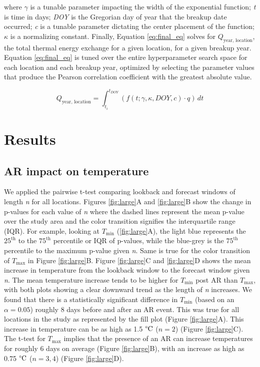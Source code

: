 \documentclass[12pts,draft]{AR_analysis_}
\begin{document}
\noindent where $\gamma$ is a tunable parameter impacting the width of
the exponential function; \emph{t} is time in days; 
\emph{DOY} is the Gregorian day of year
that the breakup date occurred; \emph{c} is a tunable parameter dictating the
center placement of the function; $\kappa$ is a normalizing constant.
Finally, Equation \ref{eq:final_eq} solves for $Q_{\text{year, location}}$,
the total thermal 
energy exchange for a given location, for a given breakup year.
Equation \ref{eq:final_eq} is tuned over the entire 
hyperparameter search space for each
location and each breakup year, optimized by selecting the 
parameter values that produce 
the Pearson correlation coefficient with the greatest absolute value. 
 

\begin{equation}
\label{eq:final_eq}
	Q_{\text{year, location}} = \int_{t_i}^{t_{DOY}} \left(f(t; \gamma, \kappa, DOY, c) \cdot
	q\right) \, dt
\end{equation}



\section{Results} 

\subsection{AR impact on temperature}

We applied the pairwise t-test comparing lookback and forecast 
windows of length \emph{n} for all locations. Figures
\ref{fig:large}A and \ref{fig:large}B show the change in p-values for each
value of \emph{n} where the dashed lines represent the mean p-value over 
the study area and the color transition signifies the interquartile range (IQR). 
For example, looking at $T_{\text{min}}$ (\ref{fig:large}A), 
the light blue represents the $\mathrm{25^{th}}$ to the 
$\mathrm{75^{th}}$ percentile or IQR of p-values, while the blue-grey is 
the $\mathrm{75^{th}}$ 
percentile to the maximum p-value given \emph{n}. Same is true for the 
color transition of $T_{\text{max}}$ in Figure \ref{fig:large}B. 
Figure \ref{fig:large}C and \ref{fig:large}D shows the mean increase 
in temperature from the lookback window to the forecast window 
given \emph{n}. The mean
temperature increase tends to be higher for $T_{\text{min}}$ post AR than  
$T_{\text{max}}$, with both plots
showing a clear downward trend as the length of \emph{n} 
increases. We found that there is a
statistically significant difference in $T_{\text{min}}$ 
(based on an $\alpha = 0.05$) roughly 8 days before and after 
an AR event. 
This was true for all locations in the study as represented 
by the fill plot (Figure \ref{fig:large}A). 
This increase in 
temperature can be as high as 1.5 $\mathrm{\degree C}$ ($n=2$) (Figure 
\ref{fig:large}C). The t-test for
 $T_{\text{max}}$ implies that the presence of an AR can increase 
 temperatures for roughly 6 days on average (Figure 
 \ref{fig:large}B), with an increase as high 
 as 0.75 $\mathrm{\degree C}$ ($n={3, 4}$) (Figure 
 \ref{fig:large}D).    
\end{document}
